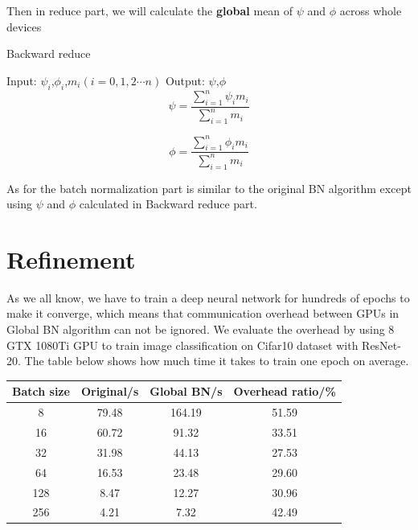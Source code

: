 Then in reduce part, we will calculate the \textbf{global} mean of $\psi$ and $\phi$ across whole devices

\begin{algorithm}
    \caption{Backward reduce}
    \label{alg:backward-reduce}
    \begin{algorithmic}[1]
        \State Input: $\psi_{i}$,$\phi_{i}$,$m_{i}$$(i = 0,1,2\cdots n)$
        \State Output: $\psi$,$\phi$
        \begin{equation}
            {\psi} = {\frac{ \sum_{i=1}^{n} {\psi_{i}} {m_{i}} }{\sum_{i=1}^{n} {m_{i}}}}
        \end{equation}

        \begin{equation}
            {\phi} = {\frac{ \sum_{i=1}^{n} {\phi_{i}} {m_{i}} }{ \sum_{i=1}^{n} {m_{i}}}}
        \end{equation}
    \end{algorithmic}
\end{algorithm}


As for the batch normalization part is similar to the original BN algorithm except using $\psi$ and $\phi$ calculated in Backward reduce part.
\section{Refinement}

As we all know, we have to train a deep neural network for hundreds of epochs to make it converge, which means that communication overhead between GPUs in Global BN algorithm can not be ignored. We evaluate the overhead by using 8 GTX 1080Ti GPU to  train image classification on Cifar10 dataset\cite{} with ResNet-20. The table below shows how much time it takes to train one epoch on average.

\begin{table}[!hbp]
    \begin{tabular}{|c|c|c|c|}
        \hline Batch size & Original/s & Global BN/s & Overhead ratio/\% \\
        \hline    8 & 79.48  &  164.19  & 51.59 \\
        \hline    16 & 60.72  &  91.32  & 33.51 \\
        \hline    32 &  31.98   &  44.13  &  27.53 \\
        \hline    64  &  16.53   &  23.48   & 29.60 \\
        \hline    128  &  8.47  &  12.27  &  30.96 \\
        \hline    256  &  4.21  &   7.32  &   42.49 \\
        \hline
    \end{tabular}
\end{table}

